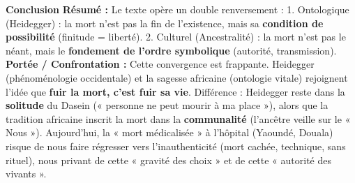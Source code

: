 \documentclass[11pt]{article}
\begin{document}
\begin{exoresolu}
\textbf{Conclusion}
\textbf{Résumé :} Le texte opère un double renversement : 1. Ontologique (Heidegger) : la mort n'est pas la fin de l'existence, mais sa \textbf{condition de possibilité} (finitude = liberté). 2. Culturel (Ancestralité) : la mort n'est pas le néant, mais le \textbf{fondement de l'ordre symbolique} (autorité, transmission).
\textbf{Portée / Confrontation :} Cette convergence est frappante. Heidegger (phénoménologie occidentale) et la sagesse africaine (ontologie vitale) rejoignent l'idée que \textbf{fuir la mort, c'est fuir sa vie}. Différence : Heidegger reste dans la \textbf{solitude} du Dasein (« personne ne peut mourir à ma place »), alors que la tradition africaine inscrit la mort dans la \textbf{communalité} (l'ancêtre veille sur le « Nous »). Aujourd'hui, la « mort médicalisée » à l'hôpital (Yaoundé, Douala) risque de nous faire régresser vers l'inauthenticité (mort cachée, technique, sans rituel), nous privant de cette « gravité des choix » et de cette « autorité des vivants ».
\end{exoresolu}
\end{document}
